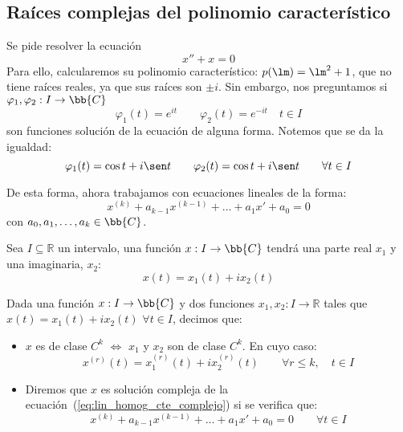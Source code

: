 \subsection{Raíces complejas del polinomio característico}
\begin{ejemplo}
    Se pide resolver la ecuación
    \begin{equation*}
        x'' + x = 0
    \end{equation*}
    Para ello, calcularemos su polinomio característico: $p(\lm) = \lm^2 + 1$, que no tiene raíces reales, ya que sus raíces son $\pm i$. Sin embargo, nos preguntamos si $\varphi_1,\varphi_2:I\rightarrow\bb{C}$
    \begin{equation*}
        \varphi_1(t) = e^{it} \qquad \varphi_2(t) = e^{-it} \quad t\in I
    \end{equation*}
    son funciones solución de la ecuación de alguna forma. Notemos que se da la igualdad:
    \begin{equation*}
        \varphi_1(t) = \cos t + i\sen t \qquad \varphi_2(t) = \cos t + i\sen t \qquad \forall t\in I
    \end{equation*}
\end{ejemplo}



De esta forma, ahora trabajamos con ecuaciones lineales de la forma:
\begin{equation}\label{eq:lin_homog_cte_complejo}
    x^{(k)} + a_{k-1}x^{(k-1)} + \ldots + a_1 x' + a_0 = 0
\end{equation}
con $a_0,a_1,\ldots,a_k \in \bb{C}$.

\noindent
Sea $I\subseteq \mathbb{R}$ un intervalo, una función $x:I\rightarrow\bb{C}$ tendrá una parte real $x_1$ y una imaginaria, $x_2$:
\begin{equation*}
    x(t) = x_1(t) + ix_2(t)
\end{equation*}

\begin{definicion}
    Dada una función $x:I\rightarrow\bb{C}$ y dos funciones $x_1,x_2:I\rightarrow\mathbb{R}$ tales que $x(t) = x_1(t) + ix_2(t)$ $\forall t\in I$, decimos que:
    \begin{itemize}
        \item $x$ es de clase $C^k$ $\Longleftrightarrow $ $x_1$ y $x_2$ son de clase $C^k$. En cuyo caso:
            \begin{equation*}
                x^{(r)}(t) = x_1^{(r)}(t) + ix_2^{(r)}(t) \qquad \forall r\leq k, \quad t\in I
            \end{equation*}
        \item Diremos que $x$ es solución compleja de la ecuación~(\ref{eq:lin_homog_cte_complejo}) si se verifica que:
            \begin{equation*}
                x^{(k)} + a_{k-1}x^{(k-1)} + \ldots + a_1 x' + a_0 = 0 \qquad \forall t\in I
            \end{equation*}
    \end{itemize}
\end{definicion}

